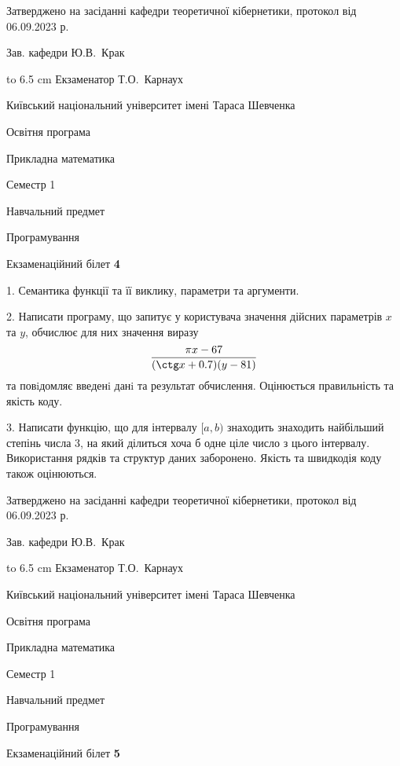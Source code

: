 \documentclass[12pt, ukrainian]{article}
\begin{document}
{\smallskip\smallskip \begin {scriptsize} Затверджено на засіданні кафедри теоретичної кібернетики, протокол   від   06.09.2023 р.\par\smallskip\smallskip\smallskip\smallskip
{\parbox {6.5 cm} {Зав. кафедри \dotfill Ю.В.~Крак}}\hspace {0.7cm} {\hbox to 6.5 cm { Екзаменатор \dotfill Т.О.~Карнаух}} \end{scriptsize}}
\newpage
{{\begin {scriptsize}\par
{ \center  Київський національний університет імені Тараса Шевченка \par}
{\parbox {5 cm}{Освітня програма \hfill}{\parbox {7 cm}{Прикладна математика\hfill}}\parbox {6 cm}{\hfill Семестр 1}}\par
{\parbox {5 cm} {Навчальний предмет \hfill}\parbox {7 cm}{Програмування \hfill}\parbox {6cm}{\hfill}\par}\vspace{-15pt} \end{scriptsize}}{\center Екзаменаційний білет \No \textbf { 4 }\par}}
{%
1. Семантика функції та її виклику, параметри та аргументи.%
\par
2. Написати програму, що запитує у користувача значення дійсних параметрів $x$ та $y$, обчислює для них значення виразу 
$$\frac{\pi x - 67}{(\ctg x + 0.7) (y - 81)}$$ 
та повiдомляє введенi данi та результат обчислення.
 Оцінюється правильність та якість коду.

\par
3. Написати функцію, що для інтервалу $[a, b)$ знаходить знаходить найбільший степінь числа 3, на який ділиться хоча б одне ціле число з цього інтервалу.  Використання рядків та структур даних заборонено. Якість та швидкодія коду також оцінюються. 

}
{\smallskip\smallskip \begin {scriptsize} Затверджено на засіданні кафедри теоретичної кібернетики, протокол   від   06.09.2023 р.\par\smallskip\smallskip\smallskip\smallskip
{\parbox {6.5 cm} {Зав. кафедри \dotfill Ю.В.~Крак}}\hspace {0.7cm} {\hbox to 6.5 cm { Екзаменатор \dotfill Т.О.~Карнаух}} \end{scriptsize}}
\vspace{0.9cm}
{{\begin {scriptsize}\par
{ \center  Київський національний університет імені Тараса Шевченка \par}
{\parbox {5 cm}{Освітня програма \hfill}{\parbox {7 cm}{Прикладна математика\hfill}}\parbox {6 cm}{\hfill Семестр 1}}\par
{\parbox {5 cm} {Навчальний предмет \hfill}\parbox {7 cm}{Програмування \hfill}\parbox {6cm}{\hfill}\par}\vspace{-15pt} \end{scriptsize}}{\center Екзаменаційний білет \No \textbf { 5 }\par}}
\end{document}
